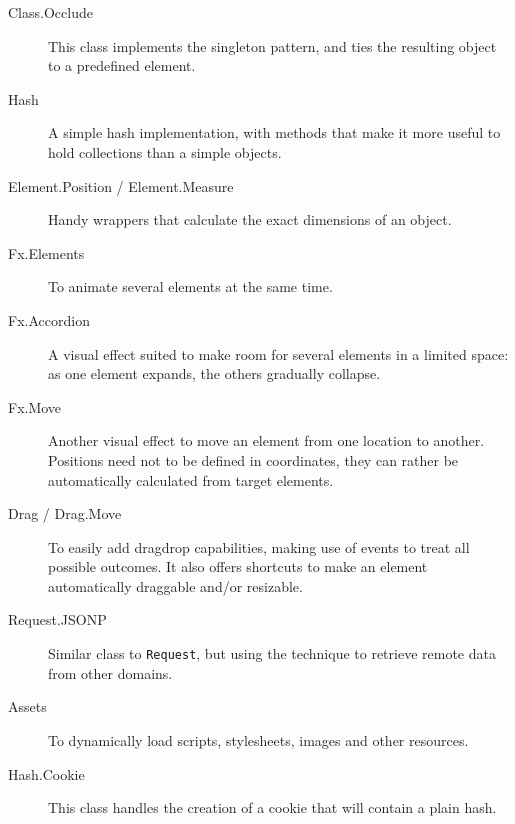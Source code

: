 \begin{description}
  \item[Class.Occlude] This class implements the singleton pattern, and ties the resulting object to a predefined  element.
  \item[Hash] A simple hash implementation, with methods that make it more useful to hold collections than a simple  objects.
  \item[Element.Position / Element.Measure] Handy wrappers that calculate the exact dimensions of an object.
  \item[Fx.Elements] To animate several elements at the same time.
  \item[Fx.Accordion] A visual effect suited to make room for several elements in a limited space: as one element expands, the others gradually collapse.
  \item[Fx.Move] Another visual effect to move an element from one location to another.
  Positions need not to be defined in coordinates, they can rather be automatically calculated from target elements.
  \item[Drag / Drag.Move] To easily add drag\et{}drop capabilities, making use of events to treat all possible outcomes.
  It also offers shortcuts to make an element automatically draggable and/or resizable.
  \item[Request.JSONP] Similar class to \texttt{Request}, but using the  technique to retrieve remote data from other domains.
  \item[Assets] To dynamically load scripts, stylesheets, images and other resources.
  \item[Hash.Cookie] This class handles the creation of a cookie that will contain a plain hash.
\end{description}



